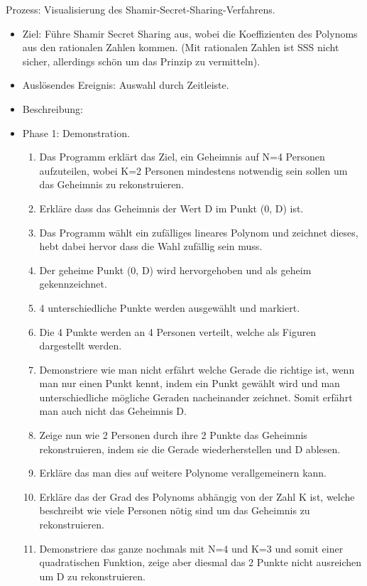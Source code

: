 \documentclass{article}
\begin{document}
\begin{FA}[start=900]
 \item Prozess: Visualisierung des Shamir-Secret-Sharing-Verfahrens.
\end{FA}
\begin{itemize}[label={}]

 \item Ziel: Führe Shamir Secret Sharing aus, wobei die Koeffizienten des Polynoms 
aus den rationalen Zahlen kommen. (Mit rationalen Zahlen ist SSS nicht sicher, 
allerdings schön um das Prinzip zu vermitteln).

 \item Auslösendes Ereignis: Auswahl durch Zeitleiste.

 \item Beschreibung:

 \item Phase 1: Demonstration.

	\begin{enumerate}[]
     \item Das Programm erklärt das Ziel,
        ein Geheimnis auf N=4 Personen aufzuteilen,
        wobei K=2 Personen mindestens notwendig sein sollen um
        das Geheimnis zu rekonstruieren.
     \item Erkläre dass das Geheimnis der Wert
        D im Punkt (0, D) ist.
     \item Das Programm wählt ein zufälliges lineares Polynom
        und zeichnet dieses, hebt dabei hervor dass die Wahl
        zufällig sein muss.
     \item Der geheime Punkt (0, D)
        wird hervorgehoben
        und als geheim gekennzeichnet.
     \item 4 unterschiedliche Punkte werden ausgewählt
        und markiert.
     \item Die 4 Punkte werden an 4 Personen
        verteilt, welche als Figuren dargestellt
        werden.
     \item Demonstriere wie man nicht erfährt
        welche Gerade die richtige ist, wenn
        man nur einen Punkt kennt, indem
        ein Punkt gewählt wird und man
        unterschiedliche mögliche Geraden
        nacheinander zeichnet.
        Somit erfährt man auch nicht
        das Geheimnis D.
     \item Zeige nun wie 2 Personen
        durch ihre 2 Punkte das Geheimnis rekonstruieren,
        indem sie die Gerade wiederherstellen und D ablesen.
     \item Erkläre das man dies auf weitere Polynome
        verallgemeinern kann.
     \item Erkläre das der Grad des Polynoms
        abhängig von der Zahl K ist, welche
        beschreibt wie viele Personen nötig
        sind um das Geheimnis zu rekonstruieren.
     \item Demonstriere das ganze nochmals mit N=4
        und K=3 und somit einer quadratischen Funktion,
        zeige aber diesmal das 2 Punkte nicht ausreichen
        um D zu rekonstruieren.
	\end{enumerate}


\end{itemize}
\end{document}
